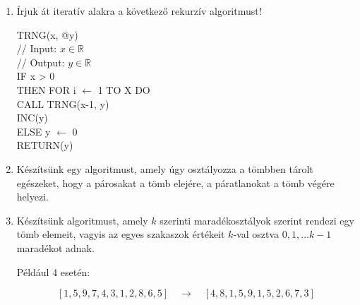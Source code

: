 \documentclass[a4paper]{article}
\begin{document}
\begin{enumerate}
ADDER(@X, i, @a, @b) \\
// Input: $X \in \mathbb{R}, i \in \mathbb{N}$ \\
// Output: $a, b \in \mathbb{R}$ \\
IF i > 0 \\
\indent \quad THEN \\
\indent \quad \quad ADDER(X, i - 1, a, b) \\
\indent \quad \quad IF $x_i$ > 0 \\
\indent \quad \quad \quad THEN a $\leftarrow$ a + $x_i$ \\
\indent \quad \quad \quad ELSE b $\leftarrow$ b + $x_i$ \\
\indent \quad ELSE \\
\indent \quad \quad a $\leftarrow$ 0 \\
\indent \quad \quad b $\leftarrow$ 0 \\
RETURN(a, b)

\item

Írjuk át iteratív alakra a következő rekurzív algoritmust!

TRNG(x, @y) \\
// Input: $x \in \mathbb{R}$ \\
// Output: $y \in \mathbb{R}$ \\
IF x > 0 \\
\indent \quad THEN FOR i $\leftarrow$ 1 TO X DO \\
\indent \quad \quad \quad \quad \quad CALL TRNG(x-1, y) \\
\indent \quad \quad \quad \quad \quad INC(y) \\
\indent \quad ELSE y $\leftarrow$ 0 \\
RETURN(y)

\item

Készítsünk egy algoritmust, amely úgy osztályozza a tömbben tárolt egészeket, hogy a párosakat a tömb elejére, a páratlanokat a tömb végére helyezi.

\item

Készítsünk algoritmust, amely $k$ szerinti maradékosztályok szerint rendezi egy tömb elemeit, vagyis az egyes szakaszok értékeit $k$-val osztva $0, 1, \ldots k-1$ maradékot adnak.

\medskip

Például 4 esetén:

$$
[1, 5, 9, 7, 4, 3, 1, 2, 8, 6, 5] \quad \rightarrow \quad [4, 8, 1, 5, 9, 1, 5, 2, 6, 7, 3]
$$


\end{enumerate}
\end{document}
